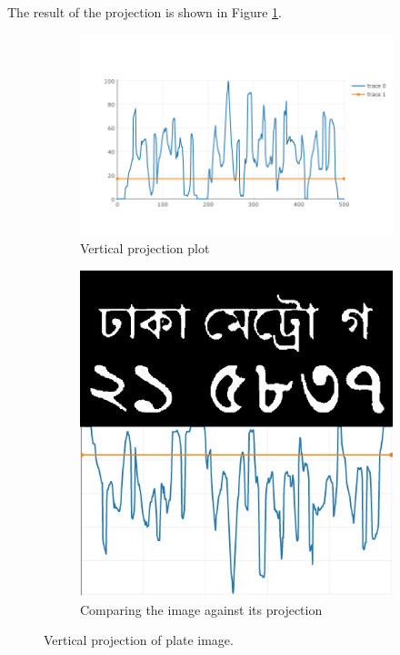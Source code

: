 \documentclass{standalone}
\begin{document}
The result of the projection is shown in Figure \ref{fig:VerticalProjection}.
\begin{figure}
\centering
\begin{subfigure}{0.9\textwidth}
  \centering
  \includegraphics[width=0.8\linewidth]{./img/plots/vertical-1}
  \caption{Vertical projection plot}
\end{subfigure}
\begin{subfigure}{0.8\textwidth}
  \centering
  \includegraphics[width=0.8\linewidth]{./img/plots/vertical-2}
  \caption{Comparing the image against its projection}
\end{subfigure}
\caption{Vertical projection of plate image.}
\label{fig:VerticalProjection}
\end{figure}
\end{document}

